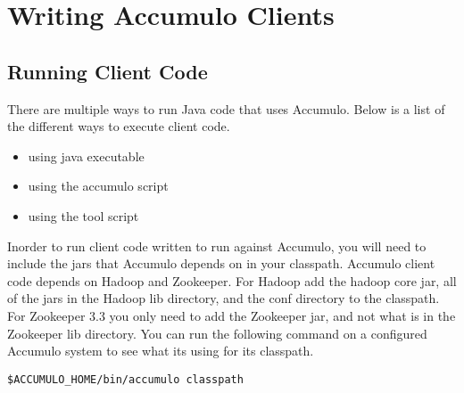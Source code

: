 
%
%

\chapter{Writing Accumulo Clients}

\section{Running Client Code}

There are multiple ways to run Java code that uses Accumulo.  Below is a list
of the different ways to execute client code.

\begin{itemize} 
  \item using java executable 
  \item using the accumulo script
  \item using the tool script 
\end{itemize}

Inorder to run client code written to run against Accumulo, you will need to
include the jars that Accumulo depends on in your classpath.  Accumulo client
code depends on Hadoop and Zookeeper.  For Hadoop add the hadoop core jar, all
of the jars in the Hadoop lib directory, and the conf directory to the
classpath. For Zookeeper 3.3 you only need to add the Zookeeper jar, and not
what is in the Zookeeper lib directory.  You can run the following command on a
configured Accumulo system to see what its using for its classpath.

\small 
\begin{verbatim} 
$ACCUMULO_HOME/bin/accumulo classpath 
\end{verbatim}
\normalsize

